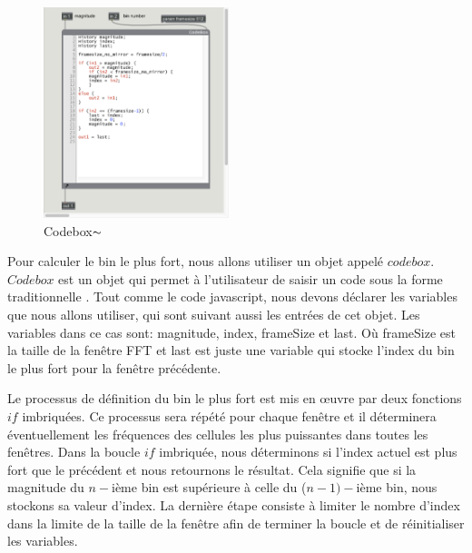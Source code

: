     \begin{figure}
      \vspace{-20pt}
      \begin{center}
        \includegraphics[width=0.48\textwidth]{Graphs/GenfftTrack.png}
      \end{center}
      \vspace{-20pt}
      \caption{Codebox$\thicksim$}
      \vspace{-10pt}
    \end{figure}


Pour calculer le bin le plus fort, nous allons utiliser un objet appelé $ codebox $. $ Codebox $ est un objet qui permet à l'utilisateur de saisir un code sous la forme \guillemotleft traditionnelle \guillemotright. Tout comme le code javascript, nous devons déclarer les variables que nous allons utiliser, qui sont suivant aussi les entrées de cet objet. Les variables dans ce cas sont: magnitude, index, frameSize et last. Où frameSize est la taille de la fenêtre FFT et last est juste une variable qui stocke l'index du bin le plus fort pour la fenêtre précédente.

Le processus de définition du bin le plus fort est mis en œuvre par deux fonctions $if$ imbriquées. Ce processus sera répété pour chaque fenêtre et il déterminera éventuellement les fréquences des cellules les plus puissantes dans toutes les fenêtres. Dans la boucle $if$ imbriquée, nous déterminons si l'index actuel est plus fort que le précédent et nous retournons le résultat. Cela signifie que si la magnitude du $ n-$ième bin est supérieure à celle du ($n-1)-$ième bin, nous stockons sa valeur d'index. La dernière étape consiste à limiter le nombre d'index dans la limite de la taille de la fenêtre afin de terminer la boucle et de réinitialiser les variables.


